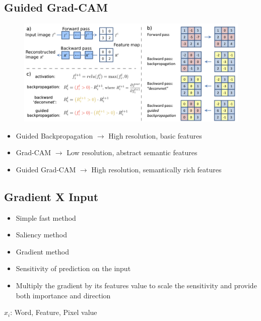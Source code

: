 \subsection{Guided Grad-CAM}
\begin{figure}[!h]
    \includegraphics[width =  \columnwidth]{figures/XAI2/GuidedGRADCAM.png}
\end{figure}
\begin{itemize}
    \item Guided Backpropagation \(\rightarrow\) High resolution, basic features
    \item Grad-CAM \(\rightarrow\) Low resolution, abstract semantic features
    \item Guided Grad-CAM \(\rightarrow\) High resolution, semantically rich features
\end{itemize}

\subsection{Gradient X Input}
\begin{itemize}
    \item Simple fast method
    \item Saliency method
    \item Gradient method
    \item Sensitivity of prediction on the input
    \item Multiply the gradient by its features value to scale the sensitivity and provide both importance and direction
\end{itemize}
\(x_i\): Word, Feature, Pixel value

